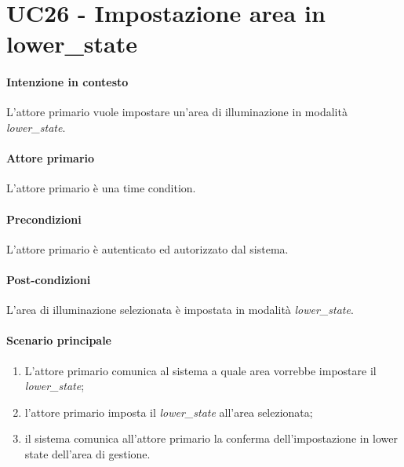 \section{UC26 - Impostazione area in lower\_state}\label{uc:26}
\paragraph{Intenzione in contesto} L'attore primario vuole impostare un'area di illuminazione in modalità \textit{lower\_state}.
\paragraph{Attore primario} L'attore primario è una time condition. %
\paragraph{Precondizioni} L'attore primario è autenticato ed autorizzato dal sistema.
\paragraph{Post-condizioni} L'area di illuminazione selezionata è impostata in modalità \textit{lower\_state}.
\paragraph{Scenario principale}
\begin{enumerate}
    \item L'attore primario comunica al sistema a quale area vorrebbe impostare il \textit{lower\_state};
    \item l'attore primario imposta il \textit{lower\_state} all'area selezionata;
    \item il sistema comunica all'attore primario la conferma dell'impostazione in lower state dell'area di gestione.
\end{enumerate}